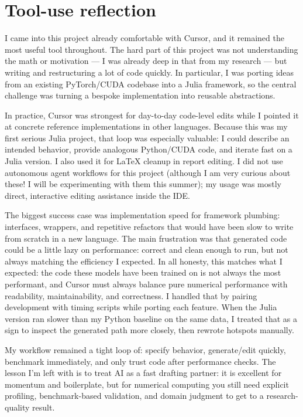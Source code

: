 \documentclass[11pt]{article}
\begin{document}
\section*{Tool-use reflection}

I came into this project already comfortable with Cursor, and it remained the most useful tool throughout. The hard part of this project was not understanding the math or motivation --- I was already deep in that from my research --- but writing and restructuring a lot of code quickly. In particular, I was porting ideas from an existing PyTorch/CUDA codebase into a Julia framework, so the central challenge was turning a bespoke implementation into reusable abstractions.

In practice, Cursor was strongest for day-to-day code-level edits while I pointed it at concrete reference implementations in other languages. Because this was my first serious Julia project, that loop was especially valuable: I could describe an intended behavior, provide analogous Python/CUDA code, and iterate fast on a Julia version. I also used it for LaTeX cleanup in report editing. I did not use autonomous agent workflows for this project (although I am very curious about these! I will be experimenting with them this summer); my usage was mostly direct, interactive editing assistance inside the IDE.

The biggest success case was implementation speed for framework plumbing: interfaces, wrappers, and repetitive refactors that would have been slow to write from scratch in a new language. The main frustration was that generated code could be a little lazy on performance: correct and clean enough to run, but not always matching the efficiency I expected. In all honesty, this matches what I expected: the code these models have been trained on is not always the most performant, and Cursor must always balance pure numerical performance with readability, maintainability, and correctness. I handled that by pairing development with timing scripts while porting each feature. When the Julia version ran slower than my Python baseline on the same data, I treated that as a sign to inspect the generated path more closely, then rewrote hotspots manually.

My workflow remained a tight loop of: specify behavior, generate/edit quickly, benchmark immediately, and only trust code after performance checks. The lesson I'm left with is to treat AI as a fast drafting partner: it is excellent for momentum and boilerplate, but for numerical computing you still need explicit profiling, benchmark-based validation, and domain judgment to get to a research-quality result.
\end{document}

